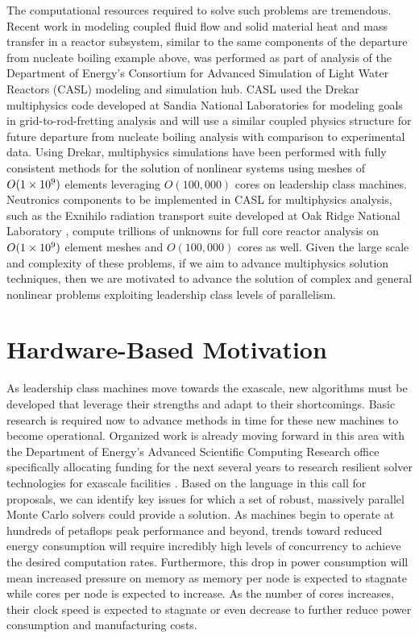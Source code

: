 The computational resources required to solve such problems are
tremendous. Recent work in modeling coupled fluid flow and solid
material heat and mass transfer in a reactor subsystem, similar to the
same components of the departure from nucleate boiling example above,
was performed as part of analysis of the Department of Energy's
Consortium for Advanced Simulation of Light Water Reactors (CASL)
modeling and simulation hub. CASL used the Drekar multiphysics code
developed at Sandia National Laboratories
\citep{pawlowski_drekar_2012} for modeling goals in
grid-to-rod-fretting analysis and will use a similar coupled physics
structure for future departure from nucleate boiling analysis with
comparison to experimental data. Using Drekar, multiphysics
simulations have been performed with fully consistent methods for the
solution of nonlinear systems using meshes of $O(1\times 10^{9})$ elements
leveraging $O(100,000)$ cores on leadership class machines. Neutronics
components to be implemented in CASL for multiphysics analysis, such
as the Exnihilo radiation transport suite developed at Oak Ridge
National Laboratory \citep{evans_denovo:_2010}, compute trillions of
unknowns for full core reactor analysis on $O(1\times 10^{9})$ element
meshes and $O(100,000)$ cores as well. Given the large scale and
complexity of these problems, if we aim to advance multiphysics
solution techniques, then we are motivated to advance the solution of
complex and general nonlinear problems exploiting leadership class
levels of parallelism.

\section{Hardware-Based Motivation}
\label{sec:hardware_motivation}
As leadership class machines move towards the exascale, new algorithms
must be developed that leverage their strengths and adapt to their
shortcomings. Basic research is required now to advance methods in
time for these new machines to become operational. Organized work is
already moving forward in this area with the Department of Energy's
Advanced Scientific Computing Research office specifically allocating
funding for the next several years to research resilient solver
technologies for exascale facilities
\citep{u.s._department_of_energy_resilient_2012}. Based on the
language in this call for proposals, we can identify key issues for
which a set of robust, massively parallel Monte Carlo solvers could
provide a solution. As machines begin to operate at hundreds of
petaflops peak performance and beyond, trends toward reduced energy
consumption will require incredibly high levels of concurrency to
achieve the desired computation rates. Furthermore, this drop in
power consumption will mean increased pressure on memory as memory per
node is expected to stagnate while cores per node is expected to
increase. As the number of cores increases, their clock speed is
expected to stagnate or even decrease to further reduce power
consumption and manufacturing costs.

